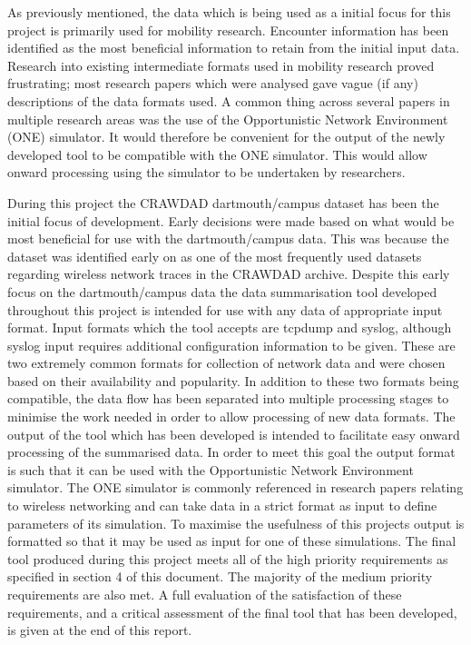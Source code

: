 As previously mentioned, the data which is being used as a initial focus for this project is primarily used for mobility research. Encounter information has been identified as the most beneficial information to retain from the initial input data. Research into existing intermediate formats used in mobility research proved frustrating; most research papers which were analysed gave vague (if any) descriptions of the data formats used. A common thing across several papers in multiple research areas was the use of the Opportunistic Network Environment (ONE) simulator. It would therefore be convenient for the output of the newly developed tool to be compatible with the ONE simulator. This would allow onward processing using the simulator to be undertaken by researchers. 

During this project the CRAWDAD dartmouth/campus dataset \cite{dartmouthcampus2009} has been the initial focus of development. Early decisions were made based on what would be most beneficial for use with the dartmouth/campus data. This was because the dataset was identified early on as one of the most frequently used datasets regarding wireless network traces in the CRAWDAD archive. Despite this early focus on the dartmouth/campus data the data summarisation tool developed throughout this project is intended for use with any data of appropriate input format. Input formats which the tool accepts are tcpdump and syslog, although syslog input requires additional configuration information to be given. These are two extremely common formats for collection of network data and were chosen based on their availability and popularity. In addition to these two formats being compatible, the data flow has been separated into multiple processing stages to minimise the work needed in order to allow processing of new data formats.
The output of the tool which has been developed is intended to facilitate easy onward processing of the summarised data. In order to meet this goal the output format is such that it can be used with the Opportunistic Network Environment simulator. The ONE simulator is commonly referenced in research papers relating to wireless networking and can take data in a strict format as input to define parameters of its simulation. To maximise the usefulness of this projects output is formatted so that it may be used as input for one of these simulations.
The final tool produced during this project meets all of the high priority requirements as specified in section 4 of this document. The majority of the medium priority requirements are also met. A full evaluation of the satisfaction of these requirements, and a critical assessment of the final tool that has been developed, is given at the end of this report.
